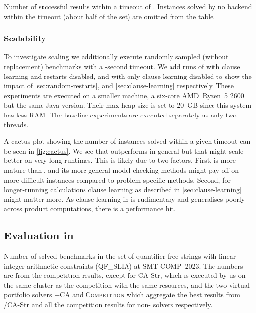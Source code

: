 \begin{table}
  \caption{Number of successful results within a timeout of \RuntimeTimeout{}.
  Instances solved by no backend within the timeout (about half of the set) are
  omitted from the table.}\label{tab:solve-status}
  \begin{center}
  
  \end{center}
\end{table}

\subsubsection{Scalability}\label{sec:scaling}%
To investigate scaling we additionally execute  randomly sampled
(without replacement) benchmarks with a -second timeout. We add
runs of \Calculus{} with clause learning and restarts disabled, and with only
clause learning disabled to show the impact of \cref{sec:random-restarts}, and
\cref{sec:clause-learning} respectively. These experiments are executed on a smaller
machine, a six-core AMD~Ryzen~5 2600 but the same Java version. Their max
heap size is set to \SI{20}{GB} since this system has less RAM. The baseline
experiments are executed separately as only two threads.

A cactus plot showing the number of instances solved within a given timeout can
be seen in \cref{fig:cactus}. We see that \Calculus{} outperforms \Nuxmv{} in
general but that \Nuxmv{} might scale better on very long runtimes. This is
likely due to two factors. First, \Nuxmv{} is more mature than \Calculus{}, and
its more general model checking methods might pay off on more difficult
instances compared to problem-specific methods. Second, for longer-running
calculations clause learning as described in \cref{sec:clause-learning} might
matter more. As clause learning in \Catra{} is rudimentary and generalises
poorly across product computations, there is a performance hit.

\subsection{Evaluation in \Ostrich{}}\label{}%

\begin{table}
  \caption{Number of solved benchmarks in the set of quantifier-free strings with
  linear integer arithmetic constraints (QF\_SLIA) at SMT-COMP~2023. The numbers are from
  the competition results, except for CA-Str, which is executed by us on the same 
  cluster as the competition with the same resources, and the two virtual portfolio solvers
  \Ostrich+CA and \textsc{Competition} which aggregate the best results from \Ostrich{}/CA-Str and 
  all the competition results for non-\Ostrich{} solvers respectively. }\label{tab:solve-status-smt-comp}
  \begin{center}
  
  \end{center}
\end{table}

